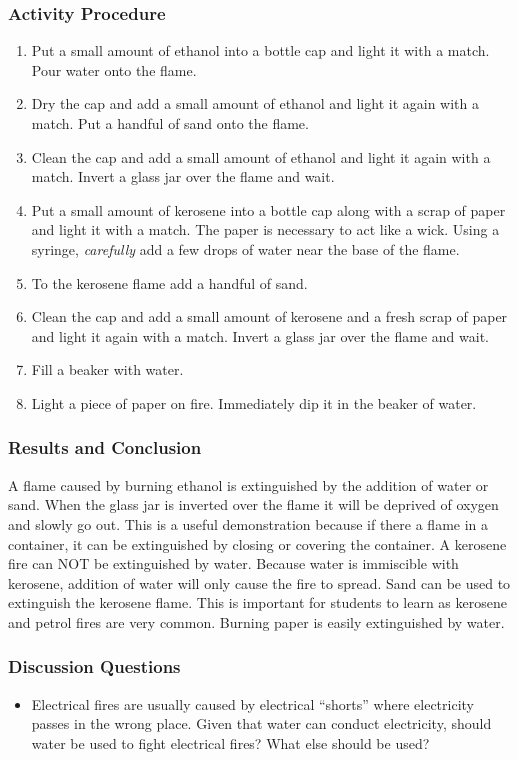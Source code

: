 \subsubsection*{Activity Procedure}
\begin{enumerate}
\item{Put a small amount of ethanol into a bottle cap and light it with a match. Pour water onto the flame.}
\item{Dry the cap and add a small amount of ethanol and light it again with a match. Put a handful of sand onto the flame.}
\item{Clean the cap and add a small amount of ethanol and light it again with a match. Invert a glass jar over the flame and wait.}
\item{Put a small amount of kerosene into a bottle cap along with a scrap of paper and light it with a match. The paper is necessary to act like a wick. Using a syringe, \textit{carefully} add a few drops of water near the base of the flame.}
\item{To the kerosene flame add a handful of sand.}
\item{Clean the cap and add a small amount of kerosene and a fresh scrap of paper and light it again with a match. Invert a glass jar over the flame and wait.}
\item{Fill a beaker with water.}
\item{Light a piece of paper on fire. Immediately dip it in the beaker of water.}
\end{enumerate}

\subsubsection*{Results and Conclusion}
A flame caused by burning ethanol is extinguished by the addition of water or sand. When the glass jar is inverted over the flame it will be deprived of oxygen and slowly go out. This is a useful demonstration because if there a flame in a container, it can be extinguished by closing or covering the container.
A kerosene fire can NOT be extinguished by water. Because water is immiscible with kerosene, addition of water will only cause the fire to spread. Sand can be used to extinguish the kerosene flame. This is important for students to learn as kerosene and petrol fires are very common.
Burning paper is easily extinguished by water.

\subsubsection*{Discussion Questions}
\begin{itemize}
\item{Electrical fires are usually caused by electrical ``shorts'' where electricity passes in the wrong place. Given that water can conduct electricity, should water be used to fight electrical fires? What else should be used?}
\end{itemize}

